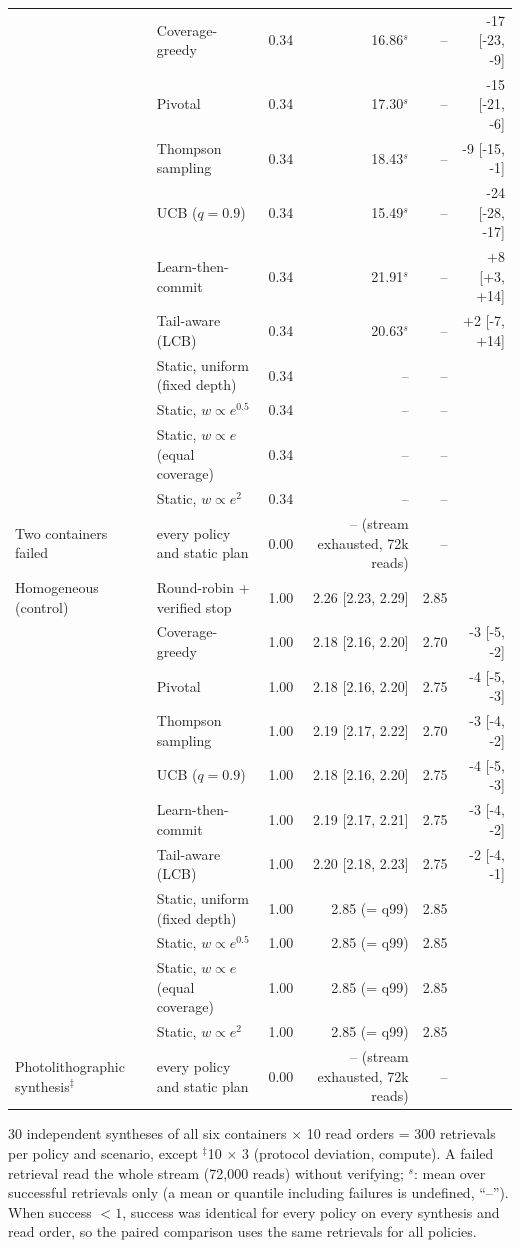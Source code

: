 \begin{table}[!t]
\begin{tabular}{@{}llrrrr@{}}
 & Coverage-greedy & 0.34 & 16.86$^{s}$ & -- & -17 [-23, -9] \\
 & Pivotal & 0.34 & 17.30$^{s}$ & -- & -15 [-21, -6] \\
 & Thompson sampling & 0.34 & 18.43$^{s}$ & -- & -9 [-15, -1] \\
 & UCB ($q{=}0.9$) & 0.34 & 15.49$^{s}$ & -- & -24 [-28, -17] \\
 & Learn-then-commit & 0.34 & 21.91$^{s}$ & -- & +8 [+3, +14] \\
 & Tail-aware (LCB) & 0.34 & 20.63$^{s}$ & -- & +2 [-7, +14] \\
 & Static, uniform (fixed depth) & 0.34 & -- & -- &  \\
 & Static, $w\propto e^{0.5}$ & 0.34 & -- & -- &  \\
 & Static, $w\propto e$ (equal coverage) & 0.34 & -- & -- &  \\
 & Static, $w\propto e^{2}$ & 0.34 & -- & -- &  \\
\midrule
Two containers failed & every policy and static plan & 0.00 & -- (stream exhausted, 72k reads) & -- & \\
\midrule
Homogeneous (control) & Round-robin + verified stop & 1.00 & 2.26 [2.23, 2.29] & 2.85 &  \\
 & Coverage-greedy & 1.00 & 2.18 [2.16, 2.20] & 2.70 & -3 [-5, -2] \\
 & Pivotal & 1.00 & 2.18 [2.16, 2.20] & 2.75 & -4 [-5, -3] \\
 & Thompson sampling & 1.00 & 2.19 [2.17, 2.22] & 2.70 & -3 [-4, -2] \\
 & UCB ($q{=}0.9$) & 1.00 & 2.18 [2.16, 2.20] & 2.75 & -4 [-5, -3] \\
 & Learn-then-commit & 1.00 & 2.19 [2.17, 2.21] & 2.75 & -3 [-4, -2] \\
 & Tail-aware (LCB) & 1.00 & 2.20 [2.18, 2.23] & 2.75 & -2 [-4, -1] \\
 & Static, uniform (fixed depth) & 1.00 & 2.85 (= q99) & 2.85 &  \\
 & Static, $w\propto e^{0.5}$ & 1.00 & 2.85 (= q99) & 2.85 &  \\
 & Static, $w\propto e$ (equal coverage) & 1.00 & 2.85 (= q99) & 2.85 &  \\
 & Static, $w\propto e^{2}$ & 1.00 & 2.85 (= q99) & 2.85 &  \\
\midrule
Photolithographic synthesis$^{\ddagger}$ & every policy and static plan & 0.00 & -- (stream exhausted, 72k reads) & -- & \\
\bottomrule
\end{tabular}

\vspace{2pt}
\parbox{\textwidth}{\scriptsize 30 independent syntheses of all six containers $\times$ 10 read orders = 300 retrievals per policy and scenario, except $^{\ddagger}$10 $\times$ 3 (protocol deviation, compute).  A failed retrieval read the whole stream (72{,}000 reads) without verifying; $^{s}$: mean over successful retrievals only (a mean or quantile including failures is undefined, ``--'').  When success $<1$, success was identical for every policy on every synthesis and read order, so the paired comparison uses the same retrievals for all policies.}
\end{table}
